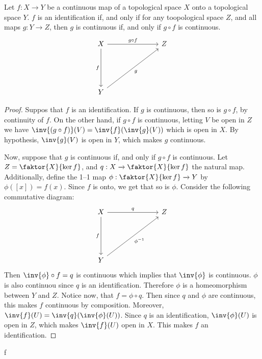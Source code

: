 \begin{theorem}\label{2.2.1}
    Let $f:X \xrightarrow{} Y$ be a continuous map of a topological space $X$
    onto a topological space  $Y$.  $f$ is an identification if, and only if for
    any toopological space $Z$, and all maps $g:Y \xrightarrow{} Z$, then $g$ is
    continuous if, and only if  $g \circ f$ is continuous.
    \[\begin{tikzcd}
            X &&& Z \\
            \\
            \\
            Y
            \arrow["{g \circ f}", from=1-1, to=1-4]
            \arrow["f"', from=1-1, to=4-1]
            \arrow["g"', from=4-1, to=1-4]
        \end{tikzcd}\]
\end{theorem}
\begin{proof}
    Suppos that $f$ is an identification. If  $g$ is continuous, then so is  $g
    \circ f$, by continuity of  $f$. On the other hand, if  $g \circ f$ is
    continuous, letting  $V$ be open in $Z$ we have $\inv{(g \circ
    f)}(V)=\inv{f}(\inv{g}(V))$ which is open in $X$. By hypothesis,
    $\inv{g}(V)$ is open in $Y$, which makes  $g$ continuous.

    Now, suppose that  $g$ is continuous if, and only if  $g \circ f$ is
    continuous. Let  $Z=\faktor{X}{\ker{f}}$, and $q:X \xrightarrow{}
    \faktor{X}{\ker{f}}$ the natural map. Additionally, define the 1--1 map
    $\phi:\faktor{X}{\ker{f}} \xrightarrow{} Y$ by $\phi([x])=f(x)$. Since $f$
    is onto, we get that so is  $\phi$. Consider the following commutative
    diagram:
        \[\begin{tikzcd}
            X &&& Z \\
            \\
            \\
            Y
            \arrow["q", from=1-1, to=1-4]
            \arrow["f"', from=1-1, to=4-1]
            \arrow["{\phi^{-1}}"', from=4-1, to=1-4]
        \end{tikzcd}\]
    Then $\inv{\phi} \circ f=q$ is continuous which implies that $\inv{\phi}$ is
    continuous. $\phi$ is also continuou since $q$ is an identification.
    Therefore  $\phi$ is a homeomorphism between $Y$ and $Z$. Notice now, that
    $f=\phi \circ q$. Then since $q$ and $\phi$ are continuous, this makes $f$
    continuous by composition. Moreover, $\inv{f}(U)=\inv{q}(\inv{\phi}(U))$.
    Since $q$ is an identification,  $\inv{\phi}(U)$ is open in $Z$, which makes
     $\inv{f}(U)$ open in $X$. This makes  $f$ an identification.
\end{proof}f
